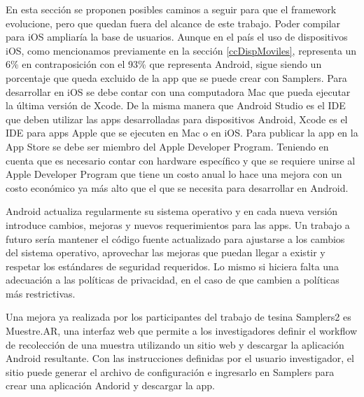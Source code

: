 En esta sección se proponen posibles caminos a seguir para que el framework evolucione, pero que quedan fuera del alcance de este trabajo. Poder compilar para iOS ampliaría la base de usuarios. Aunque en el país el uso de dispositivos iOS, como mencionamos previamente en la sección \ref{ccDispMoviles}, representa un 6\% en contraposición con el 93\% que representa Android, sigue siendo un porcentaje que queda excluido de la app que se puede crear con Samplers. Para desarrollar en iOS se debe contar con una computadora Mac que pueda ejecutar la última versión de Xcode. De la misma manera que Android Studio es el IDE que deben utilizar las apps desarrolladas para dispositivos Android, Xcode es el IDE para apps Apple que se ejecuten en Mac o en iOS. Para publicar la app en la App Store se debe ser miembro del Apple Developer Program. Teniendo en cuenta que es necesario contar con hardware específico \cite{appleDeveloper} y que se requiere unirse al Apple Developer Program que tiene un costo anual \cite{appleEnrollment} lo hace una mejora con un costo económico ya más alto que el que se necesita para desarrollar en Android. 

Android actualiza regularmente su sistema operativo y en cada nueva versión introduce cambios, mejoras y nuevos requerimientos para las apps. Un trabajo a futuro sería mantener el código fuente actualizado para ajustarse a los cambios del sistema operativo, aprovechar las mejoras que puedan llegar a existir y respetar los estándares de seguridad requeridos. Lo mismo si hiciera falta una adecuación a las políticas de privacidad, en el caso de que cambien a políticas más restrictivas. 

Una mejora ya realizada por los participantes del trabajo de tesina Samplers2\cite{samplers2} es Muestre.AR, una interfaz web que permite a los investigadores definir el workflow de recolección de una muestra utilizando un sitio web y descargar la aplicación Android resultante. Con las instrucciones definidas por el usuario investigador, el sitio puede generar el archivo de configuración e ingresarlo en Samplers para crear una aplicación Andorid y descargar la app. 



